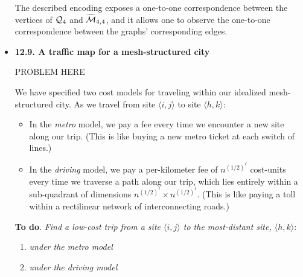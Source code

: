 \begin{itemize}
\medskip

The described encoding exposes a one-to-one correspondence between the vertices of  $\mbox{$\cal Q$}_4$ and $\widetilde{\mbox{$\cal M$}}_{4,4}$, and it allows one to observe the one-to-one correspondence between the graphs' corresponding edges.


\medskip\item
{\bf 12.9. A traffic map for a mesh-structured city}
\smallskip

PROBLEM HERE

We have specified two cost models for traveling within our idealized mesh-structured city.  As we travel from site $\langle i,j \rangle$ to site $\langle h,k \rangle$:
  \begin{itemize}
  \item
In the {\em metro} model, we pay a fee every time we encounter a new site along our trip.  (This is like buying a new metro ticket at each switch of lines.)
  \medskip\item
In the {\em driving} model, we pay a per-kilometer fee of $n^{(1/2)^\ell}$ cost-units every time we traverse a path along our trip, which lies entirely within a sub-quadrant of dimensions
$n^{(1/2)^\ell} \times n^{(1/2)^\ell}$.  (This is like paying a toll within a rectilinear network of interconnecting roads.)
  \end{itemize}

\medskip

{\bf To do}.
{\em Find a low-cost trip from a site $\langle i,j \rangle$ to the most-distant site, $\langle h,k \rangle$}:
\begin{enumerate}
\item
{\em under the metro model}
\medskip\item
{\em under the driving model}
\end{enumerate}

\medskip


\end{itemize}
